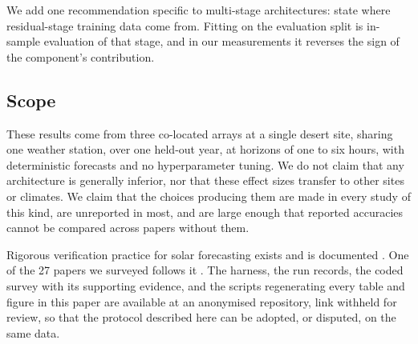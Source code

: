 We add one recommendation specific to multi-stage architectures: state
where residual-stage training data come from. Fitting on the evaluation
split is in-sample evaluation of that stage, and in our measurements it
reverses the sign of the component's contribution.

\subsection{Scope}
\label{sec:conclusion-scope}

These results come from three co-located arrays at a single desert
site, sharing one weather station, over one held-out year, at horizons
of one to six hours, with deterministic forecasts and no hyperparameter
tuning. We do not claim that any architecture is generally inferior,
nor that these effect sizes transfer to other sites or climates. We
claim that the choices producing them are made in every study of this
kind, are unreported in most, and are large enough that reported
accuracies cannot be compared across papers without them.

Rigorous verification practice for solar forecasting exists and is
documented \cite{yang2020verification, yang2019ropes}. One of the 27
papers we surveyed follows it \cite{mayer2022physmlhybrid}. The
harness, the run records, the coded survey with its supporting
evidence, and the scripts regenerating every table and figure in this
paper are available at an anonymised repository, link withheld for
review, so that the protocol described here can be adopted, or
disputed, on the same data.
